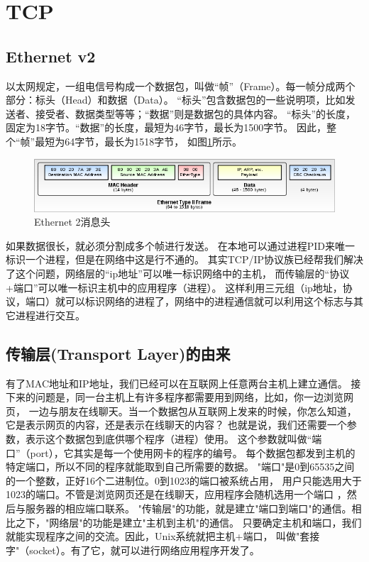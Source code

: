 \documentclass{book}
\begin{document}
\section{TCP}

\subsection{Ethernet v2}

以太网规定，一组电信号构成一个数据包，叫做“帧”（Frame）。每一帧分成两个部分：标头（Head）和数据（Data）。
“标头”包含数据包的一些说明项，比如发送者、接受者、数据类型等等；“数据”则是数据包的具体内容。
“标头”的长度，固定为18字节。“数据”的长度，最短为46字节，最长为1500字节。
因此，整个“帧”最短为64字节，最长为1518字节，
如图\ref{fig:700px-Ethernet_Type_II_Frame_format.svg}所示。

\begin{figure}[htbp]
	\centering
	\includegraphics[scale=0.5]{700px-Ethernet_Type_II_Frame_format.svg.png}
	\caption{Ethernet 2消息头}
	\label{fig:700px-Ethernet_Type_II_Frame_format.svg}
\end{figure}


如果数据很长，就必须分割成多个帧进行发送。
在本地可以通过进程PID来唯一标识一个进程，但是在网络中这是行不通的。
其实TCP/IP协议族已经帮我们解决了这个问题，网络层的“ip地址”可以唯一标识网络中的主机，
而传输层的“协议+端口”可以唯一标识主机中的应用程序（进程）。
这样利用三元组（ip地址，协议，端口）就可以标识网络的进程了，网络中的进程通信就可以利用这个标志与其它进程进行交互。

\subsection{传输层(Transport Layer)的由来}

有了MAC地址和IP地址，我们已经可以在互联网上任意两台主机上建立通信。
接下来的问题是，同一台主机上有许多程序都需要用到网络，比如，你一边浏览网页，
一边与朋友在线聊天。当一个数据包从互联网上发来的时候，你怎么知道，它是表示网页的内容，还是表示在线聊天的内容？
也就是说，我们还需要一个参数，表示这个数据包到底供哪个程序（进程）使用。
这个参数就叫做“端口”（port），它其实是每一个使用网卡的程序的编号。
每个数据包都发到主机的特定端口，所以不同的程序就能取到自己所需要的数据。
"端口"是0到65535之间的一个整数，正好16个二进制位。0到1023的端口被系统占用，
用户只能选用大于1023的端口。不管是浏览网页还是在线聊天，应用程序会随机选用一个端口
，然后与服务器的相应端口联系。
"传输层"的功能，就是建立"端口到端口"的通信。相比之下，"网络层"的功能是建立"主机到主机"的通信。
只要确定主机和端口，我们就能实现程序之间的交流。因此，Unix系统就把主机+端口，
叫做"套接字"（socket）。有了它，就可以进行网络应用程序开发了。
\end{document}
